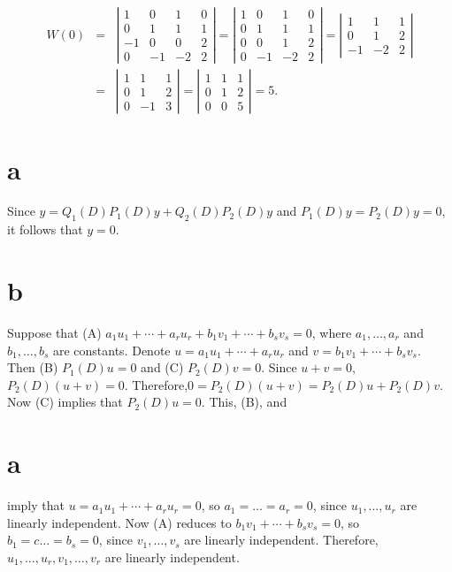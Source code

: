\documentclass[dvips]{book}
\renewcommand{\exer}[1]{\par\medskip\;\noindent{\color{red}\bf #1.}}
\numberwithin{example}{section}
\numberwithin{equation}{section}
\numberwithin{theorem}{section}
\numberwithin{table}{section}
\numberwithin{figure}{section}
\begin{document}
\begin{eqnarray*}
W(0)&=&\left|\begin{array}{rrrr}
1&0&1&0\\0&1&1&1\\-1&0&0&2\\0&-1&-2&2
\end{array}\right|=
\left|\begin{array}{rrrr}
1&0&1&0\\0&1&1&1\\0&0&1&2\\0&-1&-2&2
\end{array}\right|=
\left|\begin{array}{rrrr}
1&1&1\\0&1&2\\-1&-2&2
\end{array}\right|\\
&=&\left|\begin{array}{rrrr}
1&1&1\\0&1&2\\0&-1&3
\end{array}\right|=
\left|\begin{array}{rrrr}
1&1&1\\0&1&2\\0&0&5
\end{array}\right|=5.
\end{eqnarray*}


\exer{9.2.40}
\part{a}
Since $y=Q_1(D)P_1(D)y+Q_2(D)P_2(D)y$ and $P_1(D)y=P_2(D)y=0$, it
follows that $y=0$.

\part{b}  Suppose that
(A) $a_1u_1+\cdots+a_ru_r+b_1v_1+\cdots+b_sv_s=0$,
where $a_1,\dots,a_r$ and $b_1,\dots,b_s$ are constants. Denote
$u=a_1u_1+\cdots+a_ru_r$ and $v=b_1v_1+\cdots+b_sv_s$. Then
(B) $P_1(D)u=0$ and (C) $P_2(D)v=0$. Since $u+v=0$, $P_2(D)(u+v)=0$.
Therefore,$0=P_2(D)(u+v)=P_2(D)u+P_2(D)v$. Now (C) implies that
$P_2(D)u=0$. This, (B), and \part{a} imply that
$u=a_1u_1+\cdots+a_ru_r=0$, so $a_1=\dots=a_r=0$, since
$u_1,\dots,u_r$ are linearly independent. Now (A) reduces to
$b_1v_1+\cdots+b_sv_s=0$,
 so $b_1=c\dots=b_s=0$, since
$v_1,\dots,v_s$ are linearly independent.
Therefore,$u_1,\dots,u_r,
v_1,\dots,v_r$ are linearly independent.
\end{document}
